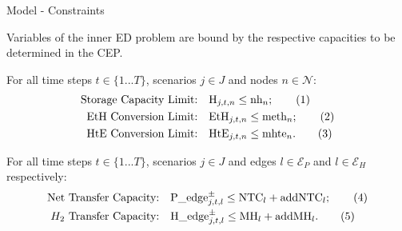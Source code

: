 \documentclass[pdf]{beamer}
\begin{document}
\begin{frame}{Model - Constraints}

  Variables of the inner ED problem are bound by the respective capacities to be determined in the CEP.
  
  For all time steps $t\in\{1...T\}$, scenarios $j\in J$ and nodes $n\in\mathcal{N}$:
\begin{align*}
    \text{Storage Capacity Limit:} \quad & \text{H}_{j,t,n} \leq \text{nh}_n ;\stepcounter{equation}\tag{\theequation}\label{constr_nh}\\
    \text{EtH Conversion Limit:} \quad & \text{EtH}_{j,t,n} \leq \text{meth}_n; \stepcounter{equation}\tag{\theequation}\label{constr_meth}\\
    \text{HtE Conversion Limit:} \quad & \text{HtE}_{j,t,n} \leq \text{mhte}_n .\stepcounter{equation}\tag{\theequation}\label{constr_mhte}
\end{align*}

For all time steps $t\in\{1...T\}$, scenarios $j\in J$ and edges $l\in \mathcal{E}_P$ and $l\in \mathcal{E}_H$ respectively: 
  \begin{align*}
    \text{Net Transfer Capacity:} \quad & \text{P\_edge}^\pm_{j,t,l}\le\text{NTC}_l + \text{addNTC}_l ;\stepcounter{equation}\tag{\theequation}\label{constr_NTC}\\
    \text{$H_2$ Transfer Capacity:} \quad & \text{H\_edge}^\pm_{j,t,l}\le\text{MH}_l + \text{addMH}_l.\stepcounter{equation}\tag{\theequation}\label{constr_MH}
\end{align*}
  \end{frame}
  
\end{document}
